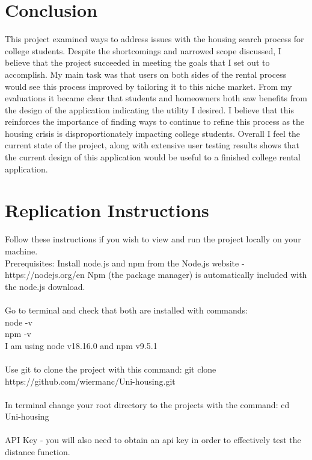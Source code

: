 \documentclass[10pt,twocolumn]{article}
\begin{document}
\section{Conclusion}
This project examined ways to address issues with the housing search process for college students. Despite the shortcomings and narrowed scope discussed, I believe that the project succeeded in meeting the goals that I set out to accomplish. My main task was that users on both sides of the rental process would see this process improved by tailoring it to this niche market. From my evaluations it became clear that students and homeowners both saw benefits from the design of the application indicating the utility I desired. I believe that this reinforces the importance of finding ways to continue to refine this process as the housing crisis is disproportionately impacting college students. Overall I feel the current state of the project, along with extensive user testing results shows that the current design of this application would be useful to a finished college rental application. 


\appendix
\section{Replication Instructions}
Follow these instructions if you wish to view and run the project locally on your machine. \\

\noindent Prerequisites:
Install node.js and npm from the Node.js website - https://nodejs.org/en
Npm (the package manager) is automatically included with the node.js download. \\
\\
Go to terminal and check that both are installed with commands:\\
node -v \\
npm -v \\

\noindent I am using node v18.16.0 and npm v9.5.1 \\
\\
Use git to clone the project with this command: git clone https://github.com/wiermanc/Uni-housing.git\\
\\
In terminal change your root directory to the projects with the command: cd Uni-housing \\
\\


API Key - you will also need to obtain an api key in order to effectively test the distance function. \\
\end{document}
